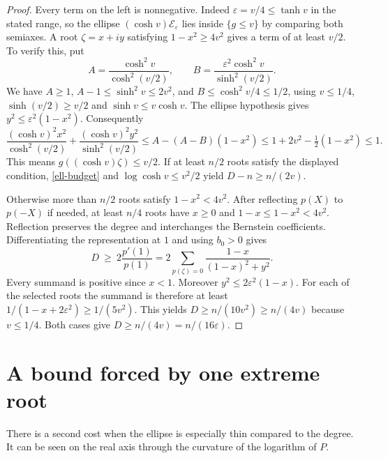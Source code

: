 \documentclass[11pt]{article}
\begin{document}
\begin{proof}
Every term on the left is nonnegative. Indeed $\varepsilon=v/4\le\tanh v$ in the stated range, so the ellipse $(\cosh v)\mathcal E_\varepsilon$ lies inside $\{g\le v\}$ by comparing both semiaxes. A root $\zeta=x+iy$ satisfying $1-x^2\ge 4v^2$ gives a term of at least $v/2$. To verify this, put
\[
 A=\frac{\cosh^2 v}{\cosh^2(v/2)},\qquad
 B=\frac{\varepsilon^2\cosh^2 v}{\sinh^2(v/2)} .
\]
We have $A\ge1$, $A-1\le\sinh^2v\le2v^2$, and $B\le\cosh^2 v/4\le1/2$, using $v\le1/4$, $\sinh(v/2)\ge v/2$ and $\sinh v\le v\cosh v$. The ellipse hypothesis gives $y^2\le\varepsilon^2(1-x^2)$. Consequently
\[
 \frac{(\cosh v)^2x^2}{\cosh^2(v/2)}
 +\frac{(\cosh v)^2y^2}{\sinh^2(v/2)}
 \le A-(A-B)(1-x^2)
 \le 1+2v^2-\tfrac12(1-x^2)\le1 .
\]
This means $g((\cosh v)\zeta)\le v/2$. If at least $n/2$ roots satisfy the displayed condition, \eqref{ell-budget} and $\log\cosh v\le v^2/2$ yield $D-n\ge n/(2v)$.

Otherwise more than $n/2$ roots satisfy $1-x^2<4v^2$. After reflecting $p(X)$ to $p(-X)$ if needed, at least $n/4$ roots have $x\ge0$ and $1-x\le 1-x^2<4v^2$. Reflection preserves the degree and interchanges the Bernstein coefficients. Differentiating the representation at $1$ and using $b_0>0$ gives
\[
 D\ \ge\ 2\frac{p'(1)}{p(1)}
    =2\sum_{p(\zeta)=0}\frac{1-x}{(1-x)^2+y^2}.
\]
Every summand is positive since $x<1$. Moreover $y^2\le 2\varepsilon^2(1-x)$. For each of the selected roots the summand is therefore at least
$1/(1-x+2\varepsilon^2)\ge 1/(5v^2)$. This yields $D\ge n/(10v^2)\ge n/(4v)$ because $v\le 1/4$. Both cases give $D\ge n/(4v)=n/(16\varepsilon)$.
\end{proof}
\section{A bound forced by one extreme root}
There is a second cost when the ellipse is especially thin compared to the degree. It can be seen on the real axis through the curvature of the logarithm of $P$.
\end{document}
